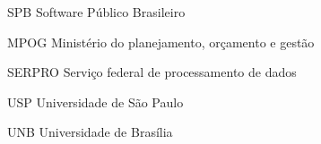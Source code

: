 \begin{siglas}
  \item[SPB] Software Público Brasileiro
  \item[MPOG] Ministério do planejamento, orçamento e gestão
  \item[SERPRO] Serviço federal de processamento de dados
  \item[USP] Universidade de São Paulo
  \item[UNB] Universidade de Brasília
\end{siglas}
